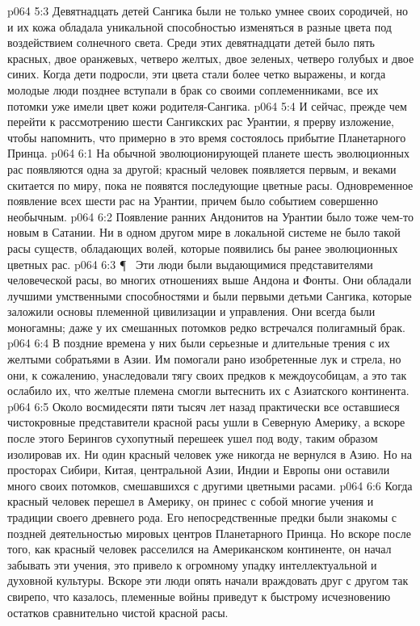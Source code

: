 \vs p064 5:3 Девятнадцать детей Сангика были не только умнее своих сородичей, но и их кожа обладала уникальной способностью изменяться в разные цвета под воздействием солнечного света. Среди этих девятнадцати детей было пять красных, двое оранжевых, четверо желтых, двое зеленых, четверо голубых и двое синих. Когда дети подросли, эти цвета стали более четко выражены, и когда молодые люди позднее вступали в брак со своими соплеменниками, все их потомки уже имели цвет кожи родителя\hyp{}Сангика.
\vs p064 5:4 И сейчас, прежде чем перейти к рассмотрению шести Сангикских рас Урантии, я прерву изложение, чтобы напомнить, что примерно в это время состоялось прибытие Планетарного Принца.
\vs p064 6:1 На обычной эволюционирующей планете шесть эволюционных рас появляются одна за другой; красный человек появляется первым, и веками скитается по миру, пока не появятся последующие цветные расы. Одновременное появление всех шести рас на Урантии, причем  было событием совершенно необычным.
\vs p064 6:2 Появление ранних Андонитов на Урантии было тоже чем\hyp{}то новым в Сатании. Ни в одном другом мире в локальной системе не было такой расы существ, обладающих волей, которые появились бы ранее эволюционных цветных рас.
\vs p064 6:3 \P\ \bibnobreakspace {} Эти люди были выдающимися представителями человеческой расы, во многих отношениях выше Андона и Фонты. Они обладали лучшими умственными способностями и были первыми детьми Сангика, которые заложили основы племенной цивилизации и управления. Они всегда были моногамны; даже у их смешанных потомков редко встречался полигамный брак.
\vs p064 6:4 В поздние времена у них были серьезные и длительные трения с их желтыми собратьями в Азии. Им помогали рано изобретенные лук и стрела, но они, к сожалению, унаследовали тягу своих предков к междоусобицам, а это так ослабило их, что желтые племена смогли вытеснить их с Азиатского континента.
\vs p064 6:5 Около восмидесяти пяти тысяч лет назад практически все оставшиеся чистокровные представители красной расы ушли в Северную Америку, а вскоре после этого Берингов сухопутный перешеек ушел под воду, таким образом изолировав их. Ни один красный человек уже никогда не вернулся в Азию. Но на просторах Сибири, Китая, центральной Азии, Индии и Европы они оставили много своих потомков, смешавшихся с другими цветными расами.
\vs p064 6:6 Когда красный человек перешел в Америку, он принес с собой многие учения и традиции своего древнего рода. Его непосредственные предки были знакомы с поздней деятельностью мировых центров Планетарного Принца. Но вскоре после того, как красный человек расселился на Американском континенте, он начал забывать эти учения, это привело к огромному упадку интеллектуальной и духовной культуры. Вскоре эти люди опять начали враждовать друг с другом так свирепо, что казалось, племенные войны приведут к быстрому исчезновению остатков сравнительно чистой красной расы.
